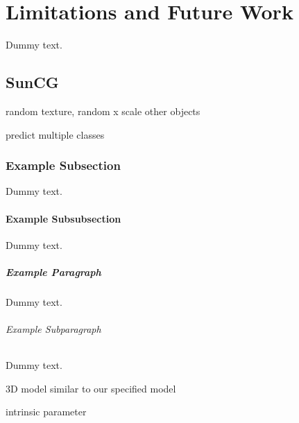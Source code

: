 \chapter{Limitations and Future Work}

Dummy text.

\section{SunCG}
random texture, random x scale
other objects

predict multiple classes

\subsection{Example Subsection}

Dummy text.

\subsubsection{Example Subsubsection}

Dummy text.

\paragraph{Example Paragraph}

Dummy text.

\subparagraph{Example Subparagraph}

Dummy text.


3D model similar to our specified model

 intrinsic parameter